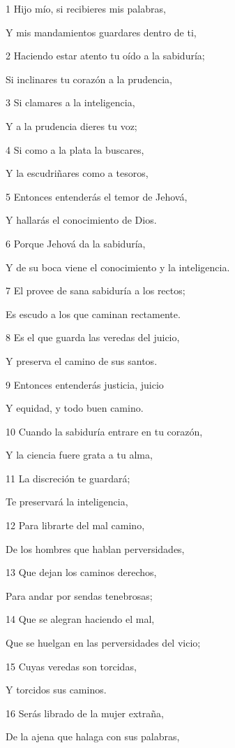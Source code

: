 \par 1 Hijo mío, si recibieres mis palabras,
\par Y mis mandamientos guardares dentro de ti,
\par 2 Haciendo estar atento tu oído a la sabiduría;
\par Si inclinares tu corazón a la prudencia,
\par 3 Si clamares a la inteligencia,
\par Y a la prudencia dieres tu voz;
\par 4 Si como a la plata la buscares,
\par Y la escudriñares como a tesoros,
\par 5 Entonces entenderás el temor de Jehová,
\par Y hallarás el conocimiento de Dios.
\par 6 Porque Jehová da la sabiduría,
\par Y de su boca viene el conocimiento y la inteligencia.
\par 7 El provee de sana sabiduría a los rectos;
\par Es escudo a los que caminan rectamente.
\par 8 Es el que guarda las veredas del juicio,
\par Y preserva el camino de sus santos.
\par 9 Entonces entenderás justicia, juicio
\par Y equidad, y todo buen camino.
\par 10 Cuando la sabiduría entrare en tu corazón,
\par Y la ciencia fuere grata a tu alma,
\par 11 La discreción te guardará;
\par Te preservará la inteligencia,
\par 12 Para librarte del mal camino,
\par De los hombres que hablan perversidades,
\par 13 Que dejan los caminos derechos,
\par Para andar por sendas tenebrosas;
\par 14 Que se alegran haciendo el mal,
\par Que se huelgan en las perversidades del vicio;
\par 15 Cuyas veredas son torcidas,
\par Y torcidos sus caminos.
\par 16 Serás librado de la mujer extraña, 
\par De la ajena que halaga con sus palabras,
